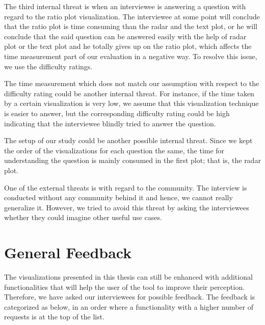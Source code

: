 The third internal threat is when an interviewee is answering a question with regard to the ratio plot visualization. The interviewee at some point will conclude that the ratio plot is time consuming than the radar and the text plot, or he will conclude that the said question can be answered easily with the help of radar plot or the text plot and he totally gives up on the ratio plot, which affects the time measurement part of our evaluation in a negative way. To resolve this issue, we use the difficulty ratings. 

The time measurement which does not match our assumption with respect to the difficulty rating could be another internal threat. For instance, if the time taken by a certain visualization is very low, we assume that this visualization technique is easier to answer, but the corresponding difficulty rating could be high indicating that the interviewee blindly tried to answer the question.

The setup of our study could be another possible internal threat. Since we kept the order of the visualizations for each question the same, the time for understanding the question is mainly consumed in the first plot; that is, the radar plot.

One of the external threats is with regard to the community. The interview is conducted without any community behind it and hence, we cannot really generalize it. However, we tried to avoid this threat by asking the interviewees whether they could imagine other useful use cases.

\section{General Feedback}
\label{sec:4.7}

The visualizations presented in this thesis can still be enhanced with additional functionalities that will help the user of the tool to improve their perception. Therefore, we have asked our interviewees for possible feedback. The feedback is categorized as below, in an order where a functionality with a higher number of requests is at the top of the list.

